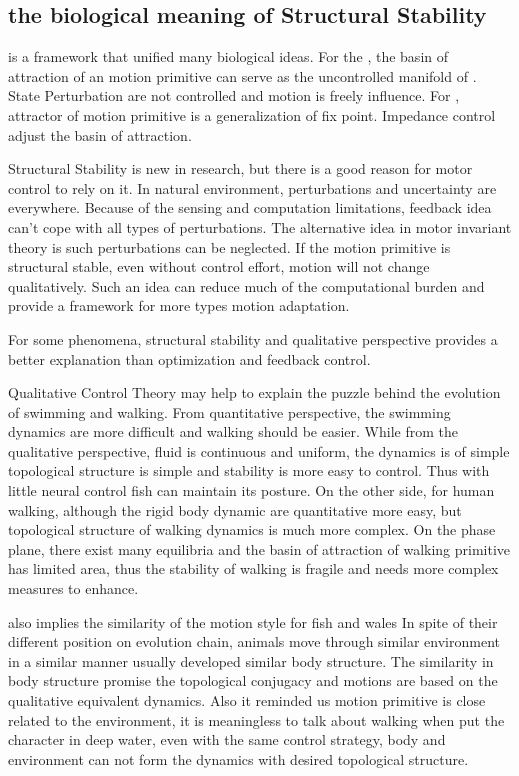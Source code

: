 \subsection{the biological meaning of Structural Stability}
\moit is a framework that unified many biological ideas.
For the  \umh,  the basin of attraction of an motion primitive can serve as the uncontrolled manifold of \umh.
State Perturbation are not controlled and motion is freely influence.
For \eph, attractor of motion primitive is a generalization of fix point.
Impedance control adjust the basin of attraction.


Structural Stability is new in \cms research, but there is a good reason for motor control to rely on it. 
In natural environment, perturbations and uncertainty are everywhere. 
Because of the sensing and computation limitations,  feedback idea  can't cope with all types of perturbations.
The alternative idea in motor invariant theory is  such perturbations can be neglected.
If the motion primitive is structural stable, even without control effort, motion will not change qualitatively.
Such an idea can reduce much of the computational burden and provide a framework for more types motion adaptation.


For some phenomena, structural stability and qualitative perspective provides a better explanation than optimization and feedback control.

Qualitative Control Theory may help to explain the  puzzle behind the  evolution of swimming and walking.
From quantitative perspective, the swimming dynamics are more difficult and walking should be easier.
While from the qualitative perspective, fluid is continuous and uniform, the dynamics is of simple topological structure is simple and stability is more easy to control.
Thus with little neural control fish can maintain its posture. 
On the other side, for human walking, although the rigid body dynamic are quantitative more easy, but topological structure of walking dynamics is much more complex. 
On the phase plane, there exist many equilibria and the basin of attraction of walking primitive has limited area,
thus the  stability of walking is fragile and needs more complex measures to enhance.

\moit also implies the similarity of the motion style for fish and wales
In spite of their different position on evolution chain, animals move through similar environment in a similar manner usually developed similar body structure.
The similarity in body structure promise the topological conjugacy and motions are based on the qualitative equivalent dynamics.
Also it reminded us motion primitive is close related to the environment, it is meaningless to talk about walking when put the character in deep water, even with the same control strategy, body and environment can not form the dynamics with desired topological structure.



